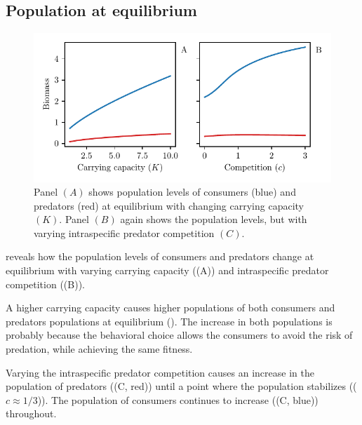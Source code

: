 \subsection{Population at equilibrium}
\begin{figure}[H]
  \caption{Panel $(A)$ shows population levels of consumers (blue) and predators (red) at equilibrium with changing carrying capacity $(K)$. Panel $(B)$ again shows the population levels, but with varying intraspecific predator competition $(C)$.}
  \label{fig:pop_levels}
  \includegraphics{plots/pop_levels_c.pdf}
\end{figure}
 reveals how the population levels of consumers and predators change at equilibrium with varying carrying capacity ((A)) and intraspecific predator competition ((B)).


A higher carrying capacity causes higher populations of both consumers and predators populations at equilibrium (). The increase in both populations is probably because the behavioral choice allows the consumers to avoid the risk of predation, while achieving the same fitness.

Varying the intraspecific predator competition causes an increase in the population of predators ((C, red)) until a point where the population stabilizes (($c\approx 1/3$)). The population of consumers continues to increase ((C, blue)) throughout.



